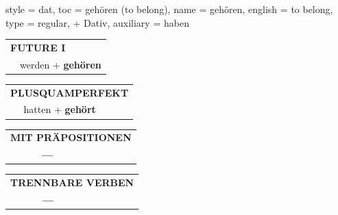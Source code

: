 \begin{verbentry}{
  style = {dat},
  toc = {gehören (to belong)},
  name = {gehören},
  english = {to belong},
  type = {regular, + Dativ},
  auxiliary = {haben}
}
\begin{tabular}{rl}
    \multicolumn{2}{l}{\textbf{FUTURE I} }\\
   & werden + \textbf{gehören}\\
 
  \end{tabular}
\hfill
   \begin{tabular}{rl}
      \multicolumn{2}{l}{\textbf{PLUSQUAMPERFEKT}}\\
   & hatten + \textbf{gehört}\\
  \end{tabular}
  
  
\vspace{10pt}

\begin{tabular}{lll}
\multicolumn{3}{l}{\textbf{MIT PRÄPOSITIONEN}}\\
& \textbf{---} & \\
\end{tabular}
\hfill
\begin{tabular}{lll}
\multicolumn{3}{l}{\textbf{TRENNBARE VERBEN}}\\
& \textbf{---} & \\
\end{tabular}
\vspace{-5pt}
\end{verbentry}

